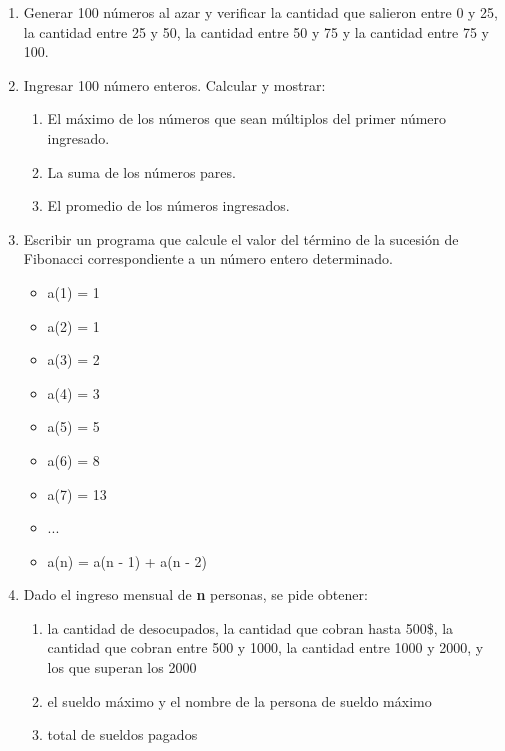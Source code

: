 \begin{enumerate}[resume]
   \item Generar 100 números al azar y verificar la cantidad que salieron entre 0 y 25, la cantidad entre 25 y 50, la cantidad entre 50 y 75 y la cantidad entre 75 y 100.
       
	\item Ingresar 100 número enteros. Calcular y mostrar:
	\begin{enumerate}
	\item El máximo de los números que sean múltiplos del primer número ingresado.
	\item La suma de los números pares.
	\item El promedio de los números ingresados.
	\end{enumerate}
   
   \item Escribir un programa que calcule el valor del término de la sucesión de Fibonacci correspondiente a un número entero determinado.
   \begin{itemize}
      \item a(1) = 1
      \item a(2) = 1
      \item a(3) = 2
      \item a(4) = 3
      \item a(5) = 5
      \item a(6) = 8
      \item a(7) = 13
      \item ...
      \item a(n) = a(n - 1) + a(n - 2)
   \end{itemize}

   \item Dado el ingreso mensual de \textbf{n} personas, se pide obtener:
    \begin{enumerate}
       \item la cantidad de desocupados, la cantidad que cobran hasta 500\$, la cantidad que cobran entre 500 y 1000, la cantidad entre 1000 y 2000, y los que superan los 2000
	   \item el sueldo máximo y el nombre de la persona de sueldo máximo
       \item total de sueldos pagados
   \end{enumerate}
  
   
   
   
\end{enumerate}

